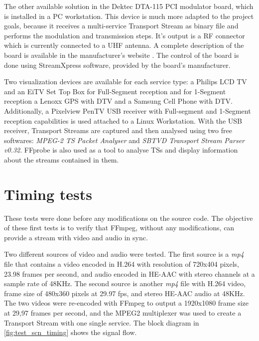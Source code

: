 \documentclass[
	12pt,				%
	openright,			%
	twoside,			%
	a4paper,			%
	brazil,
	french,				%
	english
	]{abntex2}
\begin{document}
The other available solution in the Dektec DTA-115 PCI modulator board, which is installed in a PC workstation. This device is much more adapted to the project goals, because it receives a multi-service Transport Stream as binary file and performs the modulation and transmission steps. It's output is a RF connector which is currently connected to a  UHF antenna. A complete description of the board is available in the manufacturer's website \cite{dektec}. The control of the board is done using StreamXpress software, provided by the board's manufacturer.


Two visualization devices are available for each service type: a Philips LCD TV and an EiTV Set Top Box for Full-Segment reception and for 1-Segment reception a Lenoxx GPS with DTV and a Samsung Cell Phone with DTV. Additionally, a Pixelview PenTV USB receiver with Full-segment and 1-Segment reception capabilities is used attached to a Linux Workstation. With the USB receiver, Transport Streams are captured and then analysed using two free softwares: \textit{MPEG-2 TS Packet Analyser} and \textit{SBTVD Transport Stream Parser v0.32}. FFprobe is also used as a tool to analyse TSs and display information about the streams contained in them.

\section{Timing tests}

These tests were done before any modifications on the source code. The objective of these first tests is to verify that FFmpeg, without any modifications, can provide a stream with video and audio in sync. 

Two different sources of video and audio were tested. The first source is a \textit{mp4} file that contains a video encoded in H.264 with resolution of 720x404 pixels, 23.98 frames per second, and audio encoded in HE-AAC with stereo channels at a sample rate of 48KHz. The second source is another \textit{mp4} file with H.264 video, frame size of 480x360 pixels at 29.97 fps, and stereo HE-AAC audio at 48KHz. The two videos were re-encoded with FFmpeg to output a 1920x1080 frame size at 29,97 frames per second, and the MPEG2 multiplexer was used to create a Transport Stream with one single service. The block diagram in \autoref{fig:test_scn_timing} shows the signal flow.
\end{document}
